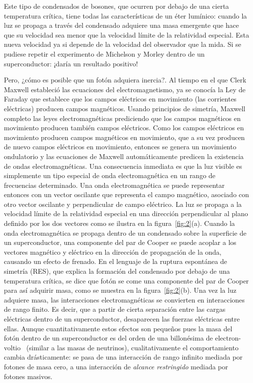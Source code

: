 Este tipo de condensados de bosones, que ocurren por debajo de una cierta temperatura crítica, tiene todas las características de un éter lumínico: cuando la luz se propaga a través del condensado adquiere una masa emergente que hace que su velocidad sea menor que la velocidad límite de la relatividad especial. Esta nueva velocidad ya si depende de la velocidad del observador que la mida. Si se pudiese repetir el experimento de Michelson y Morley dentro de un superconductor: ¡daría un resultado positivo!

Pero, ¿cómo es posible que un fotón adquiera inercia?. Al tiempo en el que Clerk Maxwell estableció las ecuaciones del electromagnetismo, ya se conocía la Ley de Faraday que establece que los campos eléctricos en movimiento (las corrientes eléctricas) producen campos magnéticos. Usando principios de simetría, Maxwell completo las leyes electromagnéticas prediciendo que los campos magnéticos en movimiento producen también campos eléctricos. Como los campos eléctricos en movimiento producen campos magnéticos en movimiento, que a su vez producen de nuevo campos eléctricos en movimiento, entonces se genera un movimiento ondulatorio y las ecuaciones de Maxwell automáticamente predicen la existencia de ondas electromagnéticas. Una consecuencia inmediata es que la luz visible es simplemente un tipo especial de onda electromagnética en un rango de frecuencias determinado. Una onda electromagnética se puede representar entonces con un vector oscilante que representa el campo magnético, asociado con otro vector oscilante y perpendicular de campo eléctrico. La luz se propaga a la velocidad límite de la relatividad especial en una dirección perpendicular al plano definido por los dos vectores como se ilustra en la figura~\ref{fig:2}(a). Cuando la onda electromagnética se propaga dentro de un condensado sobre la superficie de un superconductor, una componente del par de Cooper se puede acoplar a los vectores magnético y eléctrico en la dirección de propagación de la onda, causando un efecto de frenado. En el lenguaje de la ruptura espontánea de simetría (RES), que explica la formación del condensado por debajo de una temperatura crítica, se dice que fotón se come una componente del par de Cooper para así adquirir masa, como se muestra en la figura~\ref{fig:2}(b). Una vez la luz adquiere masa, las interacciones electromagnéticas se convierten en interacciones de rango finito. Es decir, que a partir de cierta separación entre las cargas eléctricas dentro de un superconductor, desaparecen las fuerzas eléctricas entre ellas. Aunque cuantitativamente estos efectos son pequeños pues la masa del fotón dentro de un superconductor es del orden de una billonésima de electron-voltio~\cite{sciencesup} (similar a las masas de neutrinos), cualitativamente el comportamiento cambia drásticamente: se pasa de una interacción de rango infinito mediada por fotones de masa cero, a una interacción de \emph{alcance restringido} mediada por fotones masivos. 

